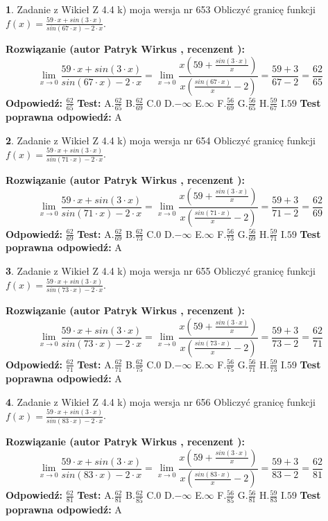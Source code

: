 \documentclass[12pt, a4paper]{article}
\theoremstyle{definition} %
\newtheorem{zad}{}
\newcommand{\zadStart}[1]{\begin{zad}#1\newline}
\newcommand{\zadStop}{\end{zad}}
\newcommand{\rozwStart}[2]{\noindent \textbf{Rozwiązanie (autor #1 , recenzent #2): }\newline}
\newcommand{\rozwStop}{\newline}
\newcommand{\odpStart}{\noindent \textbf{Odpowiedź:}\newline}
\newcommand{\odpStop}{\newline}
\newcommand{\testStart}{\noindent \textbf{Test:}\newline}
\newcommand{\testStop}{\newline}
\newcommand{\kluczStart}{\noindent \textbf{Test poprawna odpowiedź:}\newline}
\newcommand{\kluczStop}{\newline}
\begin{document}
\zadStart{Zadanie z Wikieł Z 4.4 k) moja wersja nr 653}
Obliczyć granicę funkcji $f(x)=\frac{59\cdot x +sin(3\cdot x)}{sin(67\cdot x) -2\cdot x}$.
\zadStop
\rozwStart{Patryk Wirkus}{}
$$\lim\limits_{x\to 0}\frac{59\cdot x +sin(3\cdot x)}{sin(67\cdot x) -2\cdot x}
=\lim\limits_{x\to 0}\frac{x(59+\frac{sin(3\cdot x)}{x})}{x(\frac{sin(67\cdot x)}{x}-2)}
=\frac{59+3}{67-2} = \frac{62}{65}$$
\rozwStop
\odpStart
$\frac{62}{65}$
\odpStop
\testStart
A.$\frac{62}{65}$
B.$\frac{62}{69}$
C.$0$
D.$-\infty$
E.$\infty$
F.$\frac{56}{69}$
G.$\frac{56}{65}$
H.$\frac{59}{67}$
I.$59$
\testStop
\kluczStart
A
\kluczStop



\zadStart{Zadanie z Wikieł Z 4.4 k) moja wersja nr 654}
Obliczyć granicę funkcji $f(x)=\frac{59\cdot x +sin(3\cdot x)}{sin(71\cdot x) -2\cdot x}$.
\zadStop
\rozwStart{Patryk Wirkus}{}
$$\lim\limits_{x\to 0}\frac{59\cdot x +sin(3\cdot x)}{sin(71\cdot x) -2\cdot x}
=\lim\limits_{x\to 0}\frac{x(59+\frac{sin(3\cdot x)}{x})}{x(\frac{sin(71\cdot x)}{x}-2)}
=\frac{59+3}{71-2} = \frac{62}{69}$$
\rozwStop
\odpStart
$\frac{62}{69}$
\odpStop
\testStart
A.$\frac{62}{69}$
B.$\frac{62}{73}$
C.$0$
D.$-\infty$
E.$\infty$
F.$\frac{56}{73}$
G.$\frac{56}{69}$
H.$\frac{59}{71}$
I.$59$
\testStop
\kluczStart
A
\kluczStop



\zadStart{Zadanie z Wikieł Z 4.4 k) moja wersja nr 655}
Obliczyć granicę funkcji $f(x)=\frac{59\cdot x +sin(3\cdot x)}{sin(73\cdot x) -2\cdot x}$.
\zadStop
\rozwStart{Patryk Wirkus}{}
$$\lim\limits_{x\to 0}\frac{59\cdot x +sin(3\cdot x)}{sin(73\cdot x) -2\cdot x}
=\lim\limits_{x\to 0}\frac{x(59+\frac{sin(3\cdot x)}{x})}{x(\frac{sin(73\cdot x)}{x}-2)}
=\frac{59+3}{73-2} = \frac{62}{71}$$
\rozwStop
\odpStart
$\frac{62}{71}$
\odpStop
\testStart
A.$\frac{62}{71}$
B.$\frac{62}{75}$
C.$0$
D.$-\infty$
E.$\infty$
F.$\frac{56}{75}$
G.$\frac{56}{71}$
H.$\frac{59}{73}$
I.$59$
\testStop
\kluczStart
A
\kluczStop



\zadStart{Zadanie z Wikieł Z 4.4 k) moja wersja nr 656}
Obliczyć granicę funkcji $f(x)=\frac{59\cdot x +sin(3\cdot x)}{sin(83\cdot x) -2\cdot x}$.
\zadStop
\rozwStart{Patryk Wirkus}{}
$$\lim\limits_{x\to 0}\frac{59\cdot x +sin(3\cdot x)}{sin(83\cdot x) -2\cdot x}
=\lim\limits_{x\to 0}\frac{x(59+\frac{sin(3\cdot x)}{x})}{x(\frac{sin(83\cdot x)}{x}-2)}
=\frac{59+3}{83-2} = \frac{62}{81}$$
\rozwStop
\odpStart
$\frac{62}{81}$
\odpStop
\testStart
A.$\frac{62}{81}$
B.$\frac{62}{85}$
C.$0$
D.$-\infty$
E.$\infty$
F.$\frac{56}{85}$
G.$\frac{56}{81}$
H.$\frac{59}{83}$
I.$59$
\testStop
\kluczStart
A
\kluczStop
\end{document}
